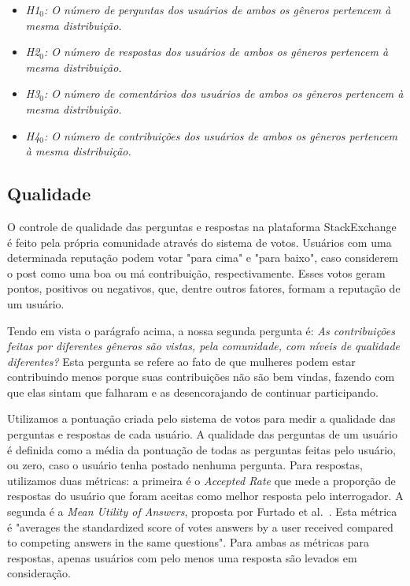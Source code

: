 \begin{itemize}
    \item \textit{H1$_0$: O número de perguntas dos usuários de ambos os gêneros pertencem à mesma distribuição.}
    \item \textit{H2$_0$: O número de respostas dos usuários de ambos os gêneros pertencem à mesma distribuição.}
    \item \textit{H3$_0$: O número de comentários dos usuários de ambos os gêneros pertencem à mesma distribuição.}
    \item \textit{H4$_0$: O número de contribuições dos usuários de ambos os gêneros pertencem à mesma distribuição.}
\end{itemize}

\subsection{Qualidade}

O controle de qualidade das perguntas e respostas na plataforma StackExchange é feito pela própria comunidade através do sistema de votos. Usuários com uma determinada reputação podem votar "para cima" e "para baixo", caso considerem o post como uma boa ou má contribuição, respectivamente. Esses votos geram pontos, positivos ou negativos, que, dentre outros fatores, formam a reputação de um usuário. 

Tendo em vista o parágrafo acima, a nossa segunda pergunta é: \textit{As contribuições feitas por diferentes gêneros são vistas, pela comunidade, com níveis de qualidade diferentes?} Esta pergunta se refere ao fato de que mulheres podem estar contribuindo menos porque suas contribuições não são bem vindas, fazendo com que elas sintam que falharam e as desencorajando de continuar participando. 

Utilizamos a pontuação criada pelo sistema de votos para medir a qualidade das perguntas e respostas de cada usuário. A qualidade das perguntas de um usuário é definida como a média da pontuação de todas as perguntas feitas pelo usuário, ou zero, caso o usuário tenha postado nenhuma pergunta. Para respostas, utilizamos duas métricas: a primeira é o \emph{Accepted Rate} que mede a proporção de respostas do usuário que foram aceitas como melhor resposta pelo interrogador. A segunda é a \emph{Mean Utility of Answers}, proposta por Furtado et al.~\cite{furtado2013contributor}. Esta métrica é "averages the standardized score of votes answers by a user received compared to competing answers in the same questions". Para ambas as métricas para respostas, apenas usuários com pelo menos uma resposta são levados em consideração.

